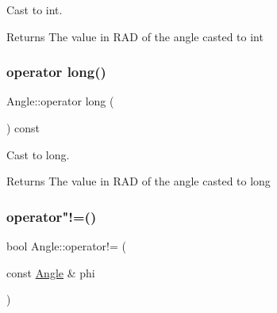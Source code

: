 Cast to int. 

\begin{DoxyReturn}{Returns}
The value in R\+AD of the angle casted to int 
\end{DoxyReturn}
\mbox{\label{class_angle_a497355a5d68f92e7801ee4072e234185}} 
\subsubsection{\texorpdfstring{operator long()}{operator long()}}
{\footnotesize\ttfamily Angle\+::operator long (\begin{DoxyParamCaption}{ }\end{DoxyParamCaption}) const\hspace{0.3cm}{\ttfamily [inline]}}



Cast to long. 

\begin{DoxyReturn}{Returns}
The value in R\+AD of the angle casted to long 
\end{DoxyReturn}
\mbox{\label{class_angle_a8d22835be41b628a5216243b7f7e50a1}} 
\subsubsection{\texorpdfstring{operator"!=()}{operator!=()}}
{\footnotesize\ttfamily bool Angle\+::operator!= (\begin{DoxyParamCaption}\item[{const \mbox{\hyperlink{class_angle}{Angle}} \&}]{phi }\end{DoxyParamCaption})\hspace{0.3cm}{\ttfamily [inline]}}

